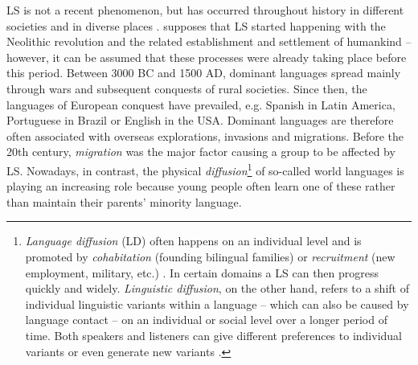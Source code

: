 \documentclass[output=paper]{langscibook}
\begin{document}
LS is not a recent phenomenon, but has occurred throughout history in different societies and in diverse places \parencite[4]{Puthuval2017}. \textcite[326--328]{Ostler2011} supposes that LS started happening with the Neolithic revolution and the related establishment and settlement of humankind -- however, it can be assumed that these processes were already taking place before this period. Between 3000 BC and 1500 AD, dominant languages spread mainly through wars and subsequent conquests of rural societies. Since then, the languages of European conquest have prevailed, e.g. Spanish in Latin America, Portuguese in Brazil or English in the USA. Dominant languages are therefore often associated with overseas explorations, invasions and migrations. Before the 20th century, \emph{migration} was the major factor causing a group to be affected by LS. Nowadays, in contrast, the physical \emph{diffusion}\footnote{\emph{Language diffusion} (LD) often happens on an individual level and is promoted by \emph{cohabitation} (founding bilingual families) or \emph{recruitment} (new employment, military, etc.) \parencite[323--324]{Ostler2011}.  In certain domains a LS can then progress quickly and widely. \emph{Linguistic diffusion}, on the other hand, refers to a shift of individual linguistic variants within a language -- which can also be caused by language contact -- on an individual or social level over a longer period of time. Both speakers and listeners can give different preferences to individual variants or even generate new variants \parencite{Gong2012}.} of so-called world languages is playing an increasing role because young people often learn one of these rather than maintain their parents' minority language.
\end{document}
